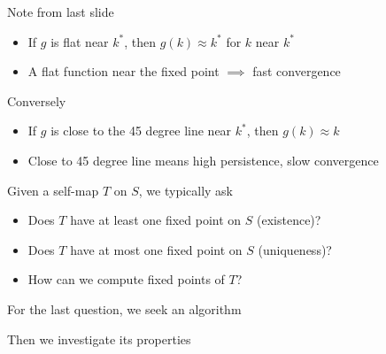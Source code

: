 \begin{frame}
    
    Note from last slide

    \begin{itemize}
        \item If $g$ is flat near $k^*$, then $g(k) \approx k^*$ for $k$ near $k^*$
    \vspace{0.3em}
        \item A flat function near the fixed point $\implies$ fast convergence
    \end{itemize}

    \vspace{0.3em}
    \vspace{0.3em}
    Conversely

    \begin{itemize}
        \item If $g$ is close to the 45 degree line near $k^*$, then $g(k)
            \approx k$ 
    \vspace{0.3em}
        \item Close to 45 degree line means high persistence, slow convergence
    \end{itemize}


\end{frame}




\begin{frame}

    Given a self-map $T$ on $S$, we typically ask
    \begin{itemize}
        \item Does $T$ have at least one fixed point on $S$ (existence)?
    \vspace{0.3em}
        \item Does $T$ have at most one fixed point on $S$ (uniqueness)?
    \vspace{0.3em}
        \item How can we compute fixed points of $T$?
    \end{itemize}

    \vspace{0.3em}
    For the last question, we seek an algorithm

    \vspace{0.3em}
    \vspace{0.3em}
    Then we investigate its properties

\end{frame}


